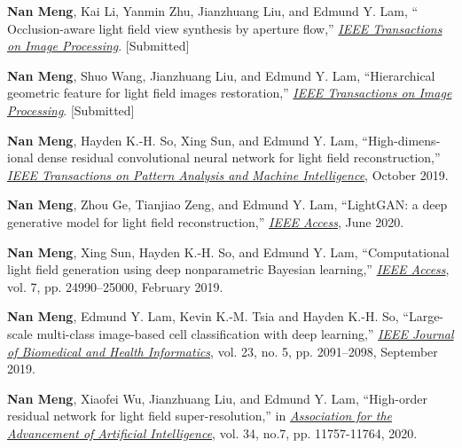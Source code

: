 \begin{publications}
\newcommand{\JourConfTitle}[1]{\ul{\emph{#1}}}


\begin{journals}
\item \textbf{Nan Meng}, Kai Li, Yanmin Zhu, Jianzhuang Liu, and Edmund Y. Lam, `` Occlusion-aware light field view synthesis by aperture flow,'' \JourConfTitle{IEEE Transactions on Image Processing}. [Submitted]

\item \textbf{Nan Meng}, Shuo Wang, Jianzhuang Liu, and Edmund Y. Lam, ``Hierarchical geometric feature for light field images restoration,'' \JourConfTitle{IEEE Transactions on Image Processing}. [Submitted]
	
\item \textbf{Nan Meng}, Hayden K.-H. So, Xing Sun, and Edmund Y. Lam, ``High-dimens-ional dense residual convolutional neural network for light field reconstruction,'' \JourConfTitle{IEEE Transactions on Pattern Analysis and Machine Intelligence}, October 2019.

\item \textbf{Nan Meng}, Zhou Ge, Tianjiao Zeng, and Edmund Y. Lam, ``LightGAN: a deep generative model for light field reconstruction,'' \JourConfTitle{IEEE Access}, June 2020.

\item \textbf{Nan Meng}, Xing Sun, Hayden K.-H. So, and Edmund Y. Lam, ``Computational light field generation using deep nonparametric Bayesian learning,'' \JourConfTitle{IEEE Access}, vol. 7, pp. 24990--25000, February 2019.

\item \textbf{Nan Meng}, Edmund Y. Lam, Kevin K.-M. Tsia and Hayden K.-H. So, ``Large-scale multi-class image-based cell classification with deep learning,'' \JourConfTitle{IEEE Journal of Biomedical and Health Informatics}, vol. 23, no. 5, pp. 2091--2098, September 2019. 
\end{journals}


\begin{conferences}
\item \textbf{Nan Meng}, Xiaofei Wu, Jianzhuang Liu, and Edmund Y. Lam, ``High-order residual network for light field super-resolution,'' in \JourConfTitle{Association for the Advancement of Artificial Intelligence}, vol. 34, no.7, pp. 11757-11764, 2020.


\end{conferences}
\end{publications}
